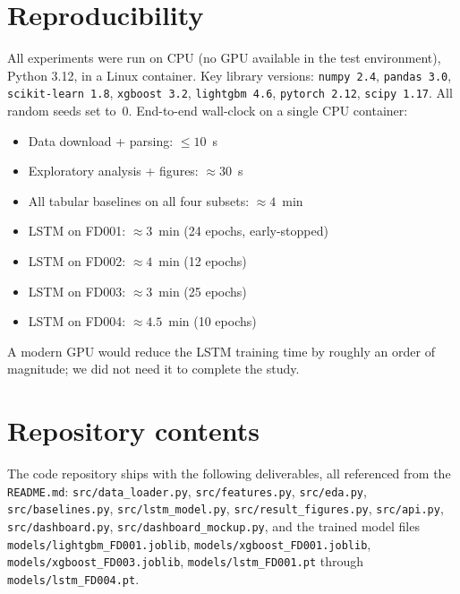 \documentclass[11pt,letterpaper]{article}
\begin{document}



\appendix
\section{Reproducibility}
\label{app:reproducibility}
All experiments were run on CPU (no GPU available in the test
environment), Python 3.12, in a Linux container. Key library versions:
\texttt{numpy 2.4}, \texttt{pandas 3.0}, \texttt{scikit-learn 1.8},
\texttt{xgboost 3.2}, \texttt{lightgbm 4.6}, \texttt{pytorch 2.12},
\texttt{scipy 1.17}. All random seeds set to~0. End-to-end wall-clock
on a single CPU container:
\begin{itemize}[leftmargin=*, itemsep=2pt, topsep=2pt]
\item Data download + parsing: $\le 10$~s
\item Exploratory analysis + figures: $\approx 30$~s
\item All tabular baselines on all four subsets: $\approx 4$~min
\item LSTM on FD001: $\approx 3$~min (24 epochs, early-stopped)
\item LSTM on FD002: $\approx 4$~min (12 epochs)
\item LSTM on FD003: $\approx 3$~min (25 epochs)
\item LSTM on FD004: $\approx 4.5$~min (10 epochs)
\end{itemize}
A modern GPU would reduce the LSTM training time by roughly an order of
magnitude; we did not need it to complete the study.

\section{Repository contents}
The code repository ships with the following deliverables, all
referenced from the \texttt{README.md}:
\verb|src/data_loader.py|, \verb|src/features.py|, \verb|src/eda.py|,
\verb|src/baselines.py|, \verb|src/lstm_model.py|,
\verb|src/result_figures.py|, \verb|src/api.py|,
\verb|src/dashboard.py|, \verb|src/dashboard_mockup.py|,
and the trained model files
\verb|models/lightgbm_FD001.joblib|,
\verb|models/xgboost_FD001.joblib|, \verb|models/xgboost_FD003.joblib|,
\verb|models/lstm_FD001.pt| through \verb|models/lstm_FD004.pt|.
\end{document}
